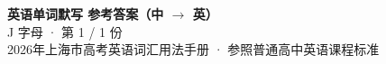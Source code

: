 \documentclass[10pt,a4paper]{article}
\begin{document}
\pagestyle{plain}

\begin{center}
{\LARGE\bfseries 英语单词默写 \quad 参考答案（中 $\to$ 英）}\\[0.22em]
{\large J 字母 · 第 1 / 1 份}\\[0.18em]
{\small 2026年上海市高考英语词汇用法手册 · 参照普通高中英语课程标准}
\end{center}

\vspace{0.2em}
\noindent{\color{rulegray}\rule{\textwidth}{0.8pt}}

\vspace{0.35em}

\vspace{0.25em}
\renewcommand{\arraystretch}{1.32}
\end{document}
